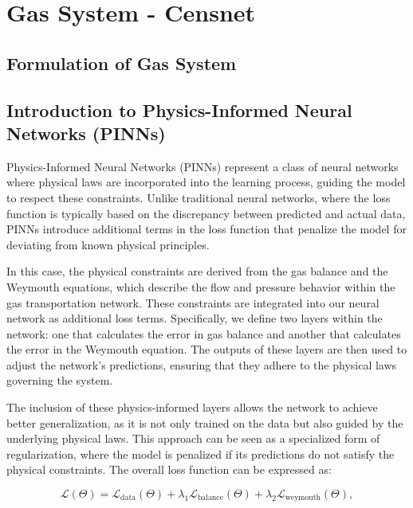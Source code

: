 \chapter{Gas System - Censnet} \label{cap:mpcc}

\section{Formulation of Gas System} \label{sec:formulation}


\section{Introduction to Physics-Informed Neural Networks (PINNs)}

Physics-Informed Neural Networks (PINNs) represent a class of neural networks where physical laws are incorporated into the learning process, guiding the model to respect these constraints. Unlike traditional neural networks, where the loss function is typically based on the discrepancy between predicted and actual data, PINNs introduce additional terms in the loss function that penalize the model for deviating from known physical principles.

In this case, the physical constraints are derived from the gas balance and the Weymouth equations, which describe the flow and pressure behavior within the gas transportation network. These constraints are integrated into our neural network as additional loss terms. Specifically, we define two layers within the network: one that calculates the error in gas balance and another that calculates the error in the Weymouth equation. The outputs of these layers are then used to adjust the network's predictions, ensuring that they adhere to the physical laws governing the system.

The inclusion of these physics-informed layers allows the network to achieve better generalization, as it is not only trained on the data but also guided by the underlying physical laws. This approach can be seen as a specialized form of regularization, where the model is penalized if its predictions do not satisfy the physical constraints. The overall loss function can be expressed as:


\begin{equation}
   \mathcal{L}(\Theta) = \mathcal{L}_{\text{data}}(\Theta) + \lambda_1 \mathcal{L}_{\text{balance}}(\Theta) + \lambda_2 \mathcal{L}_{\text{weymouth}}(\Theta),     
    \label{eq:PINN_basic_definition}
\end{equation}


